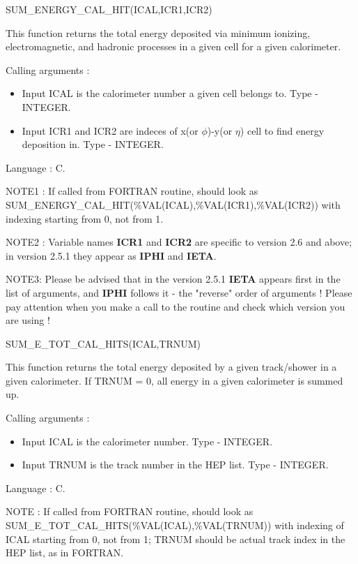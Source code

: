 \begin{center} 
SUM\_ENERGY\_CAL\_HIT(ICAL,ICR1,ICR2)
\end{center}

This function returns the total energy deposited via minimum ionizing, electromagnetic,
and hadronic processes in a given cell for a given calorimeter.

Calling arguments :
\begin{itemize}
\item {Input ICAL is the calorimeter number a given cell belongs to.
Type - INTEGER.}
\item {Input ICR1 and ICR2 are indeces of x(or $\phi$)-y(or $\eta$) cell to find energy 
deposition in. Type - INTEGER.}
\end{itemize}

Language : C.

NOTE1 : If called from FORTRAN routine, should look as \\
SUM\_ENERGY\_CAL\_HIT(\%VAL(ICAL),\%VAL(ICR1),\%VAL(ICR2)) with indexing starting 
from 0, not from 1. 

NOTE2 : Variable names {\bf ICR1} and {\bf ICR2} are specific to version 2.6 and above;
in version 2.5.1 they appear as {\bf IPHI} and {\bf IETA}.

NOTE3: Please be advised that in the version 2.5.1 {\bf IETA} appears first in the list
of arguments, and {\bf IPHI} follows it - the "reverse" order of arguments ! Please pay
attention when you make a call to the routine and check which version you are using !

\bigskip

\begin{center}
SUM\_E\_TOT\_CAL\_HITS(ICAL,TRNUM)
\end{center}

This function returns the total energy deposited by a given track/shower in a given
calorimeter. If TRNUM = 0, all energy in a given calorimeter is summed up.

Calling arguments :
\begin{itemize}
\item {Input ICAL is the calorimeter number. Type - INTEGER.} 
\item {Input TRNUM is the track number in the HEP list. Type - INTEGER.}
\end{itemize}

Language : C.

NOTE : If called from FORTRAN routine, should look as \\
SUM\_E\_TOT\_CAL\_HITS(\%VAL(ICAL),\%VAL(TRNUM)) with indexing of ICAL starting from 0,
not from 1; TRNUM should be actual track index in the HEP list, as in FORTRAN.

